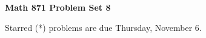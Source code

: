 \documentclass[12pt]{article}
\begin{document}
\def\ctln{\centerline}
\def\msk{\medskip}
\def\bsk{\bigskip}
\def\ssk{\smallskip}
\def\ra{\rightarrow}
\def\ubr{\underbar}
\def\sset{\subseteq}
\def\smin{\setminus}

\def\mt{{\mathcal T}}
\def\mb{{\mathcal B}}
\def\ms{{\mathcal S}}
\def\mu{{\mathcal U}}
\def\mv{{\mathcal V}}

\def\mtp{{\mathcal T}^\prime}
\def\mbp{{\mathcal B}^\prime}

\def\bbr{{\mathbb R}}
\def\bbz{{\mathbb Z}}
\def\spc{$~$\hskip.15in$~$}






\ctln{\bf Math 871 Problem Set 8}

\msk

Starred (*) problems are due Thursday, November 6.
\end{document}
